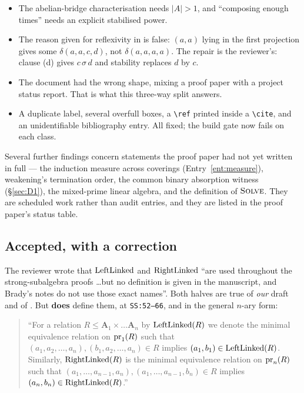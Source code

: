 \begin{itemize}
  projection --- $\proj_{1}(\bcol\delta)$ for $\proj_{2}(\bcol\delta)$ --- which
  is what made it look like a second gap.
\item The abelian-bridge characterisation needs $|A|>1$, and ``composing enough
  times'' needs an explicit stabilised power.
\item The reason given for reflexivity in  is
  false: $(a,a)$ lying in the first projection gives some $\delta(a,a,c,d)$,
  not $\delta(a,a,a,a)$. The repair is the reviewer's: clause (d) gives
  $c\,\sigma\,d$ and stability replaces $d$ by $c$.
\item The document had the wrong shape, mixing a proof paper with a project
  status report. That is what this three-way split answers.
\item A duplicate label, several overfull boxes, a \verb|\ref| printed inside a
  \verb|\cite|, and an unidentifiable bibliography entry. All fixed; the build
  gate now fails on each class.
\end{itemize}

Several further findings concern statements the proof paper had not yet written
in full --- the induction measure across coverings (Entry~\ref{ent:measure}),
weakening's termination order, the common binary absorption witness
(\S\ref{sec:D1}), the mixed-prime linear algebra, and the definition of
$\textsc{Solve}$. They are scheduled work rather than audit entries, and they
are listed in the proof paper's status table.

\subsection{Accepted, with a correction}\label{sec:review-corrected}

The reviewer wrote that $\operatorname{LeftLinked}$ and $\operatorname{RightLinked}$ ``are used throughout
the strong-subalgebra proofs \dots but no definition is given in the
manuscript, and Brady's notes do not use those exact names''. Both halves are
true of \emph{our} draft and of \cite{BradyNotes}. But
\cite{ZhukSimplified} \textbf{does} define them, at \texttt{SS:52--66}, and in
the general $n$-ary form:

\begin{quote}\small
``For a relation $R\le\mathbf A_{1}\times\dots\mathbf A_{n}$ by
$\operatorname{LeftLinked}(R)$ we denote the minimal equivalence relation on $\operatorname*{pr}_{1}(R)$
such that $(a_{1},a_{2},\dots,a_{n}),(b_{1},a_{2},\dots,a_{n})\in R$ implies
$(a_{1},b_{1})\in\operatorname{LeftLinked}(R)$. Similarly, $\operatorname{RightLinked}(R)$ is the minimal
equivalence relation on $\operatorname*{pr}_{n}(R)$ such that
$(a_{1},\dots,a_{n-1},a_{n}),(a_{1},\dots,a_{n-1},b_{n})\in R$ implies
$(a_{n},b_{n})\in\operatorname{RightLinked}(R)$.''
\end{quote}

